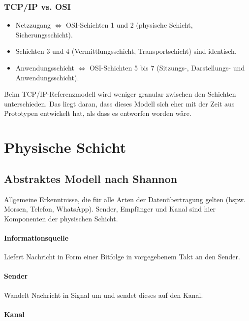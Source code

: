 \documentclass[a4paper, 14pt]{article}
\begin{document}
	\subsubsection{TCP/IP vs. OSI}

	\begin{itemize}
		\item Netzzugang $\Leftrightarrow$ OSI-Schichten 1 und 2 (physische Schicht, Sicherungsschicht).
		\item Schichten 3 und 4 (Vermittlungsschicht, Transportschicht) sind identisch.
		\item Anwendungsschicht $\Leftrightarrow$ OSI-Schichten 5 bis 7 (Sitzungs-, Darstellungs- und Anwendungsschicht).
	\end{itemize}

	Beim TCP/IP-Referenzmodell wird weniger granular zwischen den Schichten unterschieden.
	Das liegt daran, dass dieses Modell sich eher mit der Zeit aus Prototypen entwickelt hat, als dass es entworfen worden wäre.

	\section{Physische Schicht}

	\subsection{Abstraktes Modell nach Shannon}

	Allgemeine Erkenntnisse, die für alle Arten der Datenübertragung gelten (bspw. Morsen, Telefon, WhatsApp).
	Sender, Empfänger und Kanal sind hier Komponenten der physischen Schicht.

	\paragraph{Informationsquelle}

	Liefert Nachricht in Form einer Bitfolge in vorgegebenem Takt an den Sender.

	\paragraph{Sender}

	Wandelt Nachricht in Signal um und sendet dieses auf den Kanal.

	\paragraph{Kanal}
\end{document}
